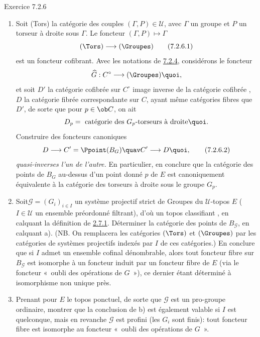 \documentclass[10pt]{../fichiers-configuration-latex/smfart}
\begin{document}
\begin{enonce*}[remark]{Exercice 7.2.6}
\begin{enumerate}
\renewcommand{\theenumi}{\alph{enumi}}
\renewcommand{\labelenumi}{\theenumi)}
\item Soit (Tors) la catégorie des couples $(\Gamma,P)\in 𝒰$,
avec $\Gamma$ un groupe et $P$ un torseur à droite sous $\Gamma$. Le
foncteur $(\Gamma,P)\mapsto \Gamma$
\begin{equation*}
(\Tors)\longrightarrow (\Groupes)\tag{7.2.6.1}
\end{equation*}
est un foncteur cofibrant. Avec les notations de \hyperref[IV.rem7.2.4]{7.2.4},
considérons le foncteur
$$
\widehat{G}:C^{\circ}\longrightarrow (\Groupes){\quoi},
$$
et soit $D'$ la catégorie cofibrée sur $C^{\circ}$ image inverse de
la catégorie cofibrée , $D$ la
catégorie fibrée
correspondante sur $C$, ayant même catégories fibres que $D'$, de
sorte que pour $p\in \ob C$, on ait
$$
D_p=\mbox{ catégorie des $G_p$-torseurs à droite}{\quoi}.
$$
Construire des foncteurs canoniques
\begin{equation*}
D\longrightarrow C'=\Ppoint(B_G)\quav C'\longrightarrow
D{\quoi},\tag{7.2.6.2}
\end{equation*}
\emph{quasi-inverses l'un de l'autre.} En particulier, en conclure
que la catégorie des points de $B_G$ au-dessus d'un point donné $p$
de $E$ est canoniquement équivalente à la catégorie des torseurs à
droite sous le groupe $G_p$.

\item Soit\pageoriginale $𝒢=(G_i)_{i\in I}$ un système
projectif strict de Groupes du $𝒰$-topos $E$ ($I\in
𝒰$ un ensemble préordonné filtrant), d'où un topos
classifiant , en calquant la définition de
\hyperref[IV.subsubsec2.7.1]{2.7.1}. Déterminer la catégorie des points de
$B_{𝒢}$, en calquant a). (NB. On remplacera les catégories
$(\Tors)$ et $(\Groupes)$ par les catégories de systèmes projectifs
indexés par $I$ de ces catégories.) En conclure que si $I$ admet un
ensemble cofinal dénombrable, alors tout foncteur fibre sur
$B_{𝒢}$ est isomorphe à un foncteur induit par un foncteur
fibre de $E$ (via le foncteur « oubli des opérations de $G$ »),
ce dernier étant déterminé à isomorphisme non unique près.

\item Prenant pour $E$ le topos ponctuel, de sorte que $𝒢$ est
un pro-groupe ordinaire, montrer que la conclusion de b) est
également valable si $I$ est quelconque, mais en revanche
$𝒢$ est profini (\ie les $G_i$ sont finis): tout foncteur
fibre est isomorphe au foncteur « oubli des opérations de $G$ ».


\end{enumerate}
\end{enonce*}
\end{document}
